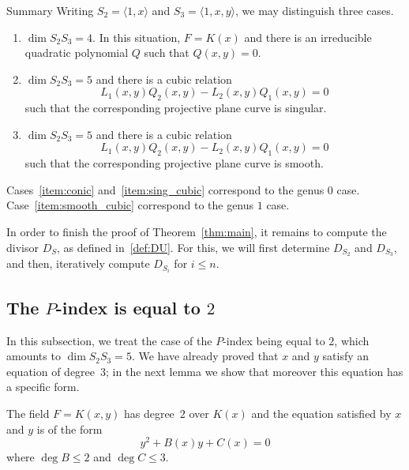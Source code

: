 \documentclass[ALCO,Unicode,ThmDefs]{cedram}
\renewcommand{\leq}{\leqslant}
\begin{document}
\begin{enonce*}[remark]{Summary}
Writing $S_2=\langle 1,x\rangle$ and $S_3=\langle 1,x,y \rangle$, we may distinguish three cases.
\begin{enumerate}
\item\label{item:conic}
$\dim S_2S_3=4$. In this situation, $F=K(x)$ and there is an irreducible quadratic polynomial $Q$ such that $Q(x,y)=0$.
\item\label{item:sing_cubic}
$\dim S_2S_3=5$ and there is a cubic
relation
\[
L_1(x,y) Q_2(x,y) - L_2(x,y) Q_1(x,y)=0
\]
such that the
corresponding projective plane curve is singular.
\item\label{item:smooth_cubic}
$\dim S_2S_3=5$ and there is a cubic
relation
\[
L_1(x,y) Q_2(x,y) - L_2(x,y) Q_1(x,y)=0
\]
such that the
corresponding projective plane curve is smooth.
\end{enumerate}
Cases~\eqref{item:conic} and~\eqref{item:sing_cubic} correspond to the genus $0$ case. Case~\eqref{item:smooth_cubic} correspond to the genus $1$ case.
\end{enonce*}

In order to finish the proof of Theorem~\ref{thm:main}, it remains to compute the divisor $D_S$, as defined in~\ref{def:DU}. For this, we will first determine $D_{S_2}$ and $D_{S_3}$, and then, iteratively compute $D_{S_i}$ for $i\leq n$.

\subsection{The \texorpdfstring{$P$}{P}-index is equal to \texorpdfstring{$2$}{2}}\label{sec:Pindex=2}

In this subsection, we treat the case of the $P$-index being equal to $2$, which amounts to $\dim S_2S_3=5$. We have already proved that $x$ and $y$ satisfy an equation of degree~$3$; in the next lemma we show that moreover this equation has a specific form.

\begin{lemm}\label{lem:deg2}
The field $F= K(x,y)$ has degree~$2$ over $K(x)$ and the equation satisfied by $x$ and $y$ is of the form
\begin{equation}\label{eq:G}
y^2+B(x)y+C(x)=0
\end{equation}
where $\deg B\leq2$ and $\deg C\leq3$.
\end{lemm}
\end{document}
